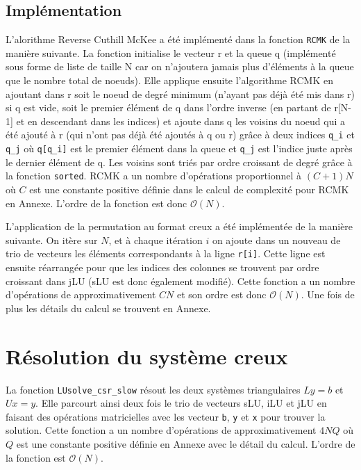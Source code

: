 \documentclass[11pt]{article}
\begin{document}
\subsection{Implémentation}
L'alorithme Reverse Cuthill McKee a été implémenté dans la fonction \texttt{RCMK} de la manière suivante. La fonction initialise le vecteur r et la queue q (implémenté sous forme de liste de taille N car on n'ajoutera jamais plus d'éléments à la queue que le nombre total de noeuds). Elle applique ensuite l'algorithme RCMK en ajoutant dans r soit le noeud de degré minimum (n'ayant pas déjà été mis dans r) si q est vide, soit le premier élément de q dans l'ordre inverse (en partant de r[N-1] et en descendant dans les indices) et ajoute dans q les voisins du noeud qui a été ajouté à r (qui n'ont pas déjà été ajoutés à q ou r) grâce à deux indices \texttt{q\_i} et \texttt{q\_j} où \texttt{q[q\_i]} est le premier élément dans la queue et \texttt{q\_j} est l'indice juste après le dernier élément de q. Les voisins sont triés par ordre croissant de degré grâce à la fonction \texttt{sorted}. RCMK a un nombre d'opérations proportionnel à $(C+1)N$ où $C$ est une constante positive définie dans le calcul de complexité pour RCMK en Annexe. L'ordre de la fonction est donc $\mathcal{O}(N)$.\\
\vspace{-8pt}

L'application de la permutation au format creux a été implémentée de la manière suivante. On itère sur $N$, et à chaque itération $i$ on ajoute dans un nouveau de trio de vecteurs les éléments correspondants à la ligne \texttt{r[i]}. Cette ligne est ensuite réarrangée pour que les indices des colonnes se trouvent par ordre croissant dans jLU (sLU est donc également modifié). Cette fonction a un nombre d'opérations de approximativement $CN$ et son ordre est donc $\mathcal{O}(N)$. Une fois de plus les détails du calcul se trouvent en Annexe.
\vspace{-8pt}

\section{Résolution du système creux}
\vspace{-10pt}
La fonction \texttt{LUsolve\_csr\_slow} résout les deux systèmes triangulaires $Ly = b$ et $Ux = y$. Elle parcourt ainsi deux fois le trio de vecteurs sLU, iLU et jLU en faisant des opérations matricielles avec les vecteur \texttt{b}, \texttt{y} et \texttt{x} pour trouver la solution. Cette fonction a un nombre d'opérations de approximativement $4NQ$ où $Q$ est une constante positive définie en Annexe avec le détail du calcul. L'ordre de la fonction est $\mathcal{O}(N)$.
\vspace{-8pt}
\end{document}
